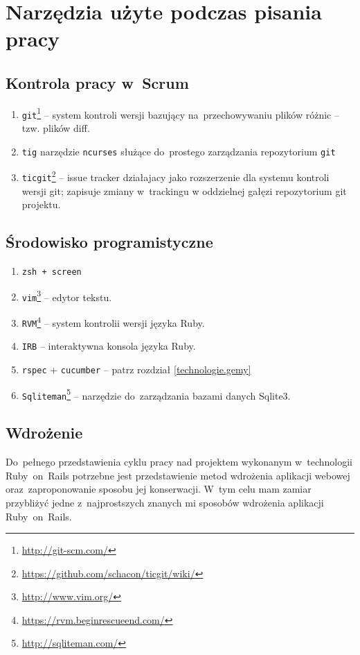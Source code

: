 \section{Narzędzia użyte podczas pisania pracy}

\subsection{Kontrola pracy w~Scrum}

\begin{enumerate}
  \item \texttt{git}\footnote{\url{http://git-scm.com/}} -- system kontroli wersji bazujący na~przechowywaniu plików różnic -- tzw. plików diff.
  \item \texttt{tig} narzędzie \texttt{ncurses} służące do~prostego zarządzania repozytorium \texttt{git}
  \item \texttt{ticgit}\footnote{\url{https://github.com/schacon/ticgit/wiki/}} -- issue tracker działajacy jako rozszerzenie dla systemu kontroli wersji git; zapisuje zmiany w~trackingu w oddzielnej gałęzi repozytorium git projektu.
\end{enumerate}

\subsection{Środowisko programistyczne}

\begin{enumerate}
  \item \texttt{zsh + screen}
  \item \texttt{vim}\footnote{\url{http://www.vim.org/}} -- edytor tekstu.
  \item \texttt{RVM}\footnote{\url{https://rvm.beginrescueend.com/}} -- system kontrolii wersji języka Ruby.
  \item \texttt{IRB} -- interaktywna konsola języka Ruby.
  \item \texttt{rspec} + \texttt{cucumber} -- patrz rozdział \ref{technologie.gemy}
  \item \texttt{Sqliteman}\footnote{\url{http://sqliteman.com/}} -- narzędzie do~zarządzania bazami danych Sqlite3.
\end{enumerate}

\subsection{Wdrożenie}

Do~pełnego przedstawienia cyklu pracy nad projektem wykonanym w~technologii Ruby~on~Rails potrzebne jest przedstawienie metod wdrożenia aplikacji webowej oraz~zaproponowanie sposobu jej konserwacji. W~tym celu mam zamiar przybliżyć jedne z~najprostszych znanych mi sposobów wdrożenia aplikacji Ruby~on~Rails.

